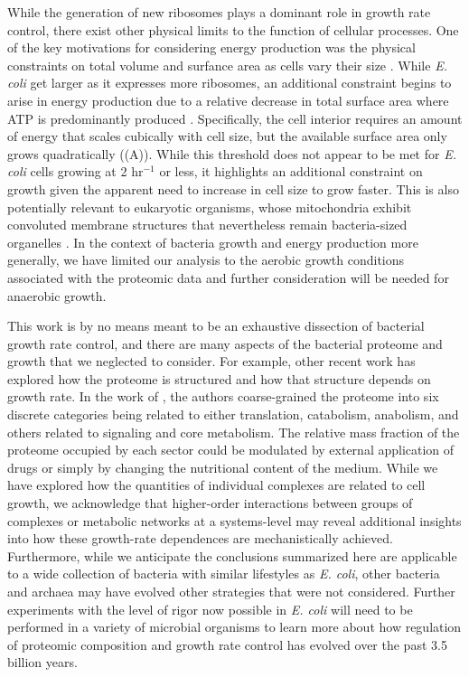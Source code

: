 While the generation of new ribosomes plays a dominant role in growth rate
control, there exist other physical limits to the function of cellular
processes. One of the key motivations for considering energy production was the
physical constraints on total volume and surfance area as cells vary their size
\citep{harris2016, ojkic2019}. While \textit{E. coli} get larger as it expresses
more ribosomes, an additional constraint begins to arise in energy production
due to a relative decrease in total surface area where ATP is predominantly
produced \citep{szenk2017}. Specifically, the cell interior requires an amount
of energy that scales cubically with cell size, but the available surface area
only grows quadratically ((A)). While this threshold does
not appear to be met for \textit{E. coli} cells growing at 2 hr$^{-1}$ or less,
it highlights an additional constraint on growth given the apparent need to
increase in cell size to grow faster. This is also potentially relevant to
eukaryotic organisms, whose mitochondria exhibit convoluted membrane structures
that nevertheless remain bacteria-sized organelles \citep{guo2018}. In the
context of bacteria growth and energy production more generally, we have limited
our analysis to the aerobic growth conditions associated with the proteomic data
and further consideration will be needed for anaerobic growth.

This work is by no means meant to be an exhaustive dissection of bacterial
growth rate control, and there are many aspects of the bacterial proteome and
growth that we neglected to consider. For example, other recent work
\citep{liebermeister2014, hui2015, schmidt2016} has explored how the proteome is
structured and how that structure depends on growth rate. In the work of
\cite{hui2015}, the authors coarse-grained the proteome into six discrete
categories being related to either translation, catabolism, anabolism, and
others related to signaling and core metabolism. The relative mass fraction of
the proteome occupied by each sector could be modulated by external application
of drugs or simply by changing the nutritional content of the medium. While we
have explored how the quantities of individual complexes are related to cell
growth, we acknowledge that higher-order interactions between groups of
complexes or metabolic networks at a systems-level may reveal additional
insights into how these growth-rate dependences  are mechanistically achieved.
Furthermore, while we anticipate the conclusions summarized here are applicable
to a wide collection of bacteria with similar lifestyles as \textit{E. coli},
other bacteria and archaea may have evolved other strategies that were not
considered. Further experiments with the level of rigor now possible in
\textit{E. coli} will need to be performed in a variety of microbial organisms
to learn more about how regulation of proteomic composition and  growth rate
control has evolved over the past 3.5 billion years.

